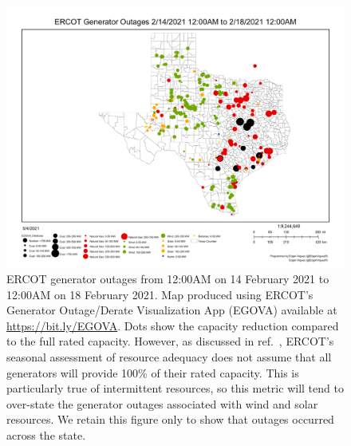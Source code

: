 \documentclass[12pt]{iopart}
\begin{document}
\begin{figure}
  \includegraphics[width=\textwidth]{EGOVA.pdf}
  \caption{
    ERCOT generator outages from 12:00AM on 14 February 2021 to 12:00AM on 18 February 2021.
    Map produced using ERCOT's Generator Outage/Derate Visualization App (EGOVA) available at \url{https://bit.ly/EGOVA}.
    Dots show the capacity reduction compared to the full rated capacity.
    However, as discussed in ref.~\cite{ercotpublic_outagesv2:2021}, ERCOT's seasonal assessment of resource adequacy does not assume that all generators will provide 100\% of their rated capacity.
    This is particularly true of intermittent resources, so this metric will tend to over-state the generator outages associated with wind and solar resources.
    We retain this figure only to show that outages occurred across the state.
  }\label{fig:egova}
\end{figure}
\end{document}
